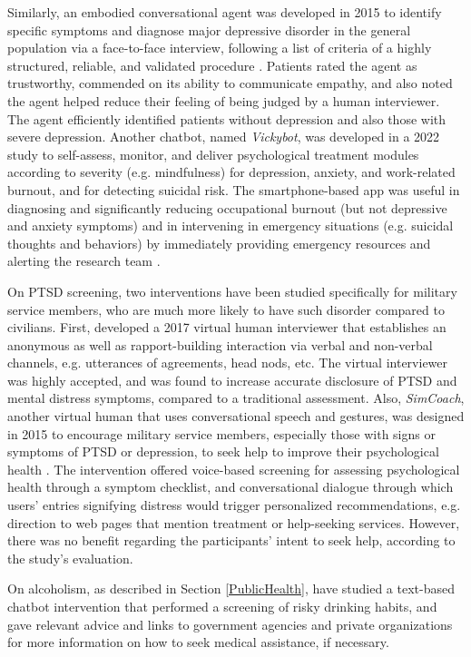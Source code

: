 Similarly, an embodied conversational agent was developed in 2015 to identify specific symptoms and diagnose major depressive disorder in the general population via a face-to-face interview, following a list of criteria of a highly structured, reliable, and validated procedure \cite{mdddiagnosis2017}. Patients rated the agent as trustworthy, commended on its ability to communicate empathy, and also noted the agent helped reduce their feeling of being judged by a human interviewer. The agent efficiently identified patients without depression and also those with severe depression. Another chatbot, named \textit{Vickybot}, was developed in a 2022 study to self-assess, monitor, and deliver psychological treatment modules according to severity (e.g. mindfulness) for depression, anxiety, and work-related burnout, and for detecting suicidal risk. The smartphone-based app was useful in diagnosing and significantly reducing occupational burnout (but not depressive and anxiety symptoms) and in intervening in emergency situations (e.g. suicidal thoughts and behaviors) by immediately providing emergency resources and alerting the research team \cite{vickybot2023}.

On PTSD screening, two interventions have been studied specifically for military service members, who are much more likely to have such disorder compared to civilians. First, \citeauthor{mentalhealthbarriers2017} developed a 2017 virtual human interviewer that establishes an anonymous as well as rapport-building interaction via verbal and non-verbal channels, e.g. utterances of agreements, head nods, etc. The virtual interviewer was highly accepted, and was found to increase accurate disclosure of PTSD and mental distress symptoms, compared to a traditional assessment. Also, \textit{SimCoach}, another virtual human that uses conversational speech and gestures, was designed in 2015 to encourage military service members, especially those with signs or symptoms of PTSD or depression, to seek help to improve their psychological health \cite{SimCoach2016}. The intervention offered voice-based screening for assessing psychological health through a symptom checklist, and conversational dialogue through which users' entries signifying distress would trigger personalized recommendations, e.g. direction to web pages that mention treatment or help-seeking services. However, there was no benefit regarding the participants' intent to seek help, according to the study's evaluation. 

On alcoholism, as described in Section \ref{PublicHealth}, \citeauthor{alcoholism2016} have studied a text-based chatbot intervention that performed a screening of risky drinking habits, and gave relevant advice and links to government agencies and private organizations for more information on how to seek medical assistance, if necessary.

